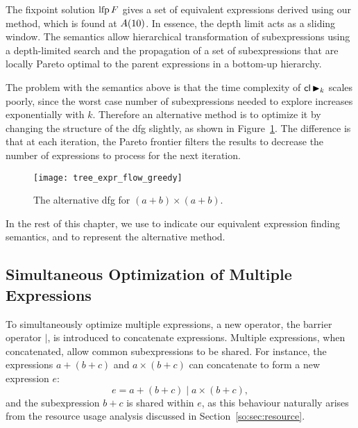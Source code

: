 The fixpoint solution $\operatorname{\mathrm{lfp}} F$ gives a set of equivalent expressions derived
using our method, which is found at $A({10})$. In essence, the depth limit
acts as a sliding window.  The semantics allow hierarchical transformation of
subexpressions using a depth-limited search and the propagation of a set of
subexpressions that are locally Pareto optimal to the parent expressions in a
bottom-up hierarchy.

The problem with the semantics above is that the time complexity of $\mathsf{cl}
\operatorname{\blacktriangleright}_k$ scales poorly, since the worst case number of subexpressions needed
to explore increases exponentially with $k$. Therefore an alternative method is
to optimize it by changing the structure of the \gls{dfg} slightly, as shown
in Figure~\ref{so:fig:tree_expr_flow_greedy}. The difference is that at each
iteration, the Pareto frontier filters the results to decrease the number of
expressions to process for the next iteration.
\begin{figure}[ht]
    \centering
    \texttt{[image: tree\_expr\_flow\_greedy]}
    \caption{The alternative \gls{dfg} for $(a + b) \times (a + b)$.
    }\label{so:fig:tree_expr_flow_greedy}
\end{figure}

In the rest of this chapter, we use \frontiertrace{} to indicate our equivalent
expression finding semantics, and \greedytrace{} to represent the alternative
method.


\subsection{Simultaneous Optimization of Multiple Expressions}

To simultaneously optimize multiple expressions, a new operator, the barrier
operator $\mid$, is introduced to concatenate expressions.  Multiple
expressions, when concatenated, allow common subexpressions to be shared.  For
instance, the expressions $a + (b + c)$ and $a \times (b + c)$ can concatenate
to form a new expression $e$:
\begin{equation}
    e = a + (b + c) \mid a \times (b + c),
\end{equation}
and the subexpression $b + c$ is shared within $e$, as this behaviour
naturally arises from the resource usage analysis discussed in
Section~\ref{so:sec:resource}.

